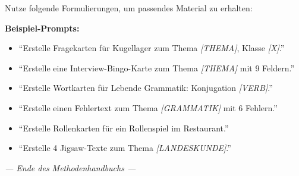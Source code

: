 \documentclass[11pt, a4paper]{article}
\begin{document}
Nutze folgende Formulierungen, um passendes Material zu erhalten:

\begin{tcolorbox}[colback=hellgrau, colframe=grau, boxrule=0.5pt, arc=0pt]
\textbf{Beispiel-Prompts:}
\begin{itemize}[leftmargin=*]
    \item ``Erstelle Fragekarten für Kugellager zum Thema \textit{[THEMA]}, Klasse \textit{[X]}.''
    \item ``Erstelle eine Interview-Bingo-Karte zum Thema \textit{[THEMA]} mit 9 Feldern.''
    \item ``Erstelle Wortkarten für Lebende Grammatik: Konjugation \textit{[VERB]}.''
    \item ``Erstelle einen Fehlertext zum Thema \textit{[GRAMMATIK]} mit 6 Fehlern.''
    \item ``Erstelle Rollenkarten für ein Rollenspiel im Restaurant.''
    \item ``Erstelle 4 Jigsaw-Texte zum Thema \textit{[LANDESKUNDE]}.''
\end{itemize}
\end{tcolorbox}

\vspace{2em}

\begin{center}
\textit{--- Ende des Methodenhandbuchs ---}
\end{center}
\end{document}
